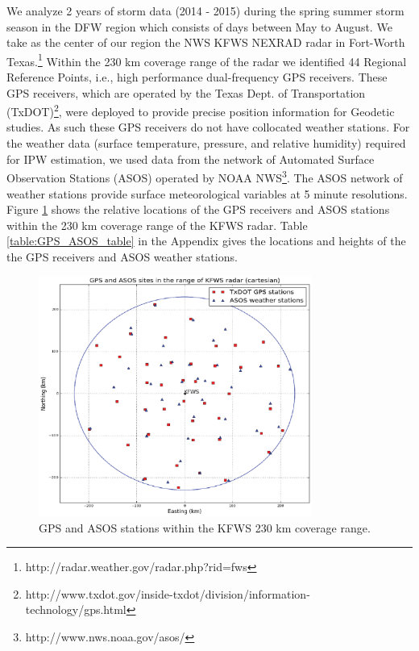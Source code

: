 \documentclass[proposal]{umassthesis}
\begin{document}
We analyze 2 years of storm data (2014 - 2015) during the spring summer storm season in the DFW region which consists of days between May to August. We take as the center of our region the NWS KFWS NEXRAD radar in Fort-Worth Texas.\footnote{http://radar.weather.gov/radar.php?rid=fws} Within the 230 km coverage range of the radar we identified 44 Regional Reference Points, i.e., high performance dual-frequency GPS receivers. These GPS receivers, which are operated by the Texas Dept. of Transportation (TxDOT)\footnote{http://www.txdot.gov/inside-txdot/division/information-technology/gps.html}, were deployed to provide precise position information for Geodetic studies. As such these GPS receivers do not have collocated weather stations. For the weather data (surface temperature, pressure, and relative humidity) required for IPW estimation, we used data from the network of Automated Surface Observation Stations (ASOS) operated by NOAA NWS\footnote{http://www.nws.noaa.gov/asos/}. The ASOS network of weather stations provide surface meteorological variables at 5 minute resolutions. Figure \ref{fig:GPS_ASOS_Loc} shows the relative locations of the GPS receivers and ASOS stations within the 230 km coverage range of the KFWS radar. Table \ref{table:GPS_ASOS_table} in the Appendix gives the locations and heights of the the GPS receivers and ASOS weather stations.
\begin{figure}[!t]
\begin{center}
\includegraphics[width = 0.8\textwidth]{GPS_ASOS_Locations.eps}
\caption{GPS and ASOS stations within the KFWS 230 km coverage range.}
\label{fig:GPS_ASOS_Loc}
\end{center}
\end{figure}
\end{document}
